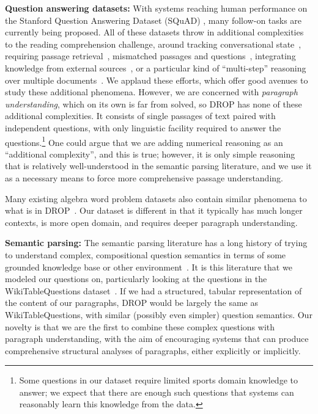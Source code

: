 \textbf{Question answering datasets:} With systems reaching human performance on the Stanford Question Answering Dataset (SQuAD) \citep{Rajpurkar2016SQuAD10}, many follow-on tasks are currently being proposed.  All of these datasets throw in additional complexities to the reading comprehension challenge, around tracking conversational state~\citep{Reddy2018CoQAAC,Choi2018QuACQA}, requiring passage retrieval~\citep{Joshi2017TriviaQAAL,Yang2018HotpotQAAD}, mismatched passages and questions~\citep{Saha2018DuoRCTC,Kocisk2018TheNR,Rajpurkar2018KnowWY}, integrating knowledge from external sources~\citep{Mihaylov2018CanAS,Zhang2018ReCoRDBT}, or a particular kind of ``multi-step'' reasoning over multiple documents~\citep{Welbl2018ConstructingDF,Khashabi2018LookingBT}.  We applaud these efforts, which offer good avenues to study these additional phenomena.  However, we are concerned with \emph{paragraph understanding}, which on its own is far from solved, so DROP has none of these additional complexities.  It consists of single passages of text paired with independent questions, with only linguistic facility required to answer the questions.\footnote{Some questions in our dataset require limited sports domain knowledge to answer; we expect that there are enough such questions that systems can reasonably learn this knowledge from the data.}  One could argue that we are adding numerical reasoning as an ``additional complexity'', and this is true; however, it is only simple reasoning that is relatively well-understood in the semantic parsing literature, and we use it as a necessary means to force more comprehensive passage understanding.

Many existing algebra word problem datasets also contain similar phenomena to what is in DROP~\citep{KoncelKedziorski2015ParsingAW,Ling2017ProgramIB}.  Our dataset is different in that it typically has much longer contexts, is more open domain, and requires deeper paragraph understanding.
  
\textbf{Semantic parsing:} The semantic parsing literature has a long history of trying to understand complex, compositional question semantics in terms of some grounded knowledge base or other environment~\citep[\emph{inter alia}]{Zelle1996LearningTP,Zettlemoyer2005LearningTM,Berant2013SemanticPO}.  It is this literature that we modeled our questions on, particularly looking at the questions in the WikiTableQuestions dataset~\citep{Pasupat2015CompositionalSP}.  If we had a structured, tabular representation of the content of our paragraphs, DROP would be largely the same as WikiTableQuestions, with similar (possibly even simpler) question semantics.  Our novelty is that we are the first to combine these complex questions with paragraph understanding, with the aim of encouraging systems that can produce comprehensive structural analyses of paragraphs, either explicitly or implicitly.

